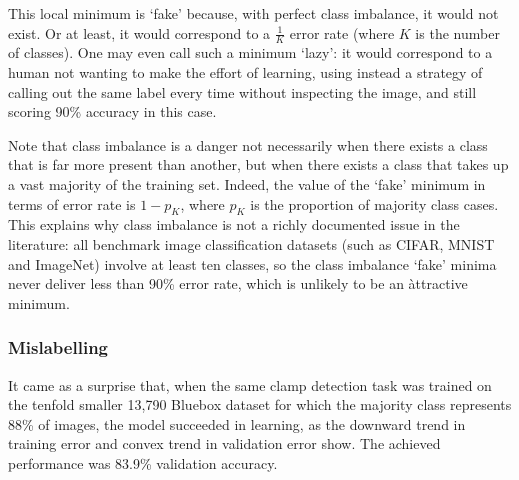 \documentclass[a4paper,11pt]{article}
\begin{document}
This local minimum is `fake' because, with perfect class imbalance, it would not exist. Or at least, it would correspond to a $\frac{1}{K}$ error rate (where $K$ is the number of classes). One may even call such a minimum `lazy': it would correspond to a human not wanting to make the effort of learning, using instead a strategy of calling out the same label every time without inspecting the image, and still scoring 90\% accuracy in this case.

Note that class imbalance is a danger not necessarily when there exists a class that is far more present than another, but when there exists a class that takes up a vast majority of the training set. Indeed, the value of the `fake' minimum in terms of error rate is $1 - p_K$, where $p_K$ is the proportion of majority class cases. This explains why class imbalance is not a richly documented issue in the literature: all benchmark image classification datasets (such as CIFAR, MNIST and ImageNet) involve at least ten classes, so the class imbalance `fake' minima never deliver less than 90\% error rate, which is unlikely to be an àttractive minimum. 

\subsubsection{Mislabelling}

It came as a surprise that, when the same clamp detection task was trained on the tenfold smaller 13,790 Bluebox dataset for which the majority class represents 88\% of images, the model succeeded in learning, as the downward trend in training error and convex trend in validation error show. The achieved performance was 83.9\% validation accuracy.
\end{document}
